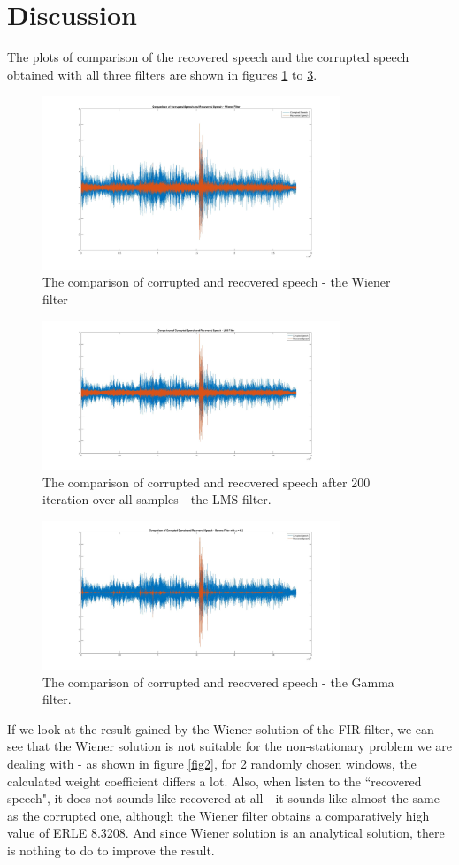 \documentclass[conference]{IEEEtran}
\begin{document}
\section{Discussion}
	The plots of comparison of the recovered speech and the corrupted speech obtained with all three filters are shown in figures \ref{comWiener} to \ref{comGamma}.
	\begin{figure}[htbp]
	\centerline{\includegraphics[width=3.5in]{WienerComparison.jpg}}
	\caption{The comparison of corrupted and recovered speech - the Wiener filter}
	\label{comWiener}
	\end{figure}	
	\begin{figure}[htbp]
	\centerline{\includegraphics[width=3.5in]{LMScomparison.jpg}}
	\caption{The comparison of corrupted and recovered speech after 200 iteration over all samples - the LMS filter.}
	\label{comGamma}
	\end{figure}
	\begin{figure}[htbp]
	\centerline{\includegraphics[width=3.5in]{Gamma_eta001_mu02.jpg}}
	\caption{The comparison of corrupted and recovered speech - the Gamma filter.}
	\label{comGamma}
	\end{figure}
	If we look at the result gained by the Wiener solution of the FIR filter,  we can see that the Wiener solution is not suitable for the non-stationary problem we are dealing with - as shown in figure \ref{fig2}, for 2 randomly chosen windows, the calculated weight coefficient differs a lot. Also, when listen to the ``recovered speech", it does not sounds like recovered at all - it sounds like almost the same as the corrupted one, although the Wiener filter obtains a comparatively high value of ERLE 8.3208. And since Wiener solution is an analytical solution, there is nothing to do to improve the result.
\end{document}
